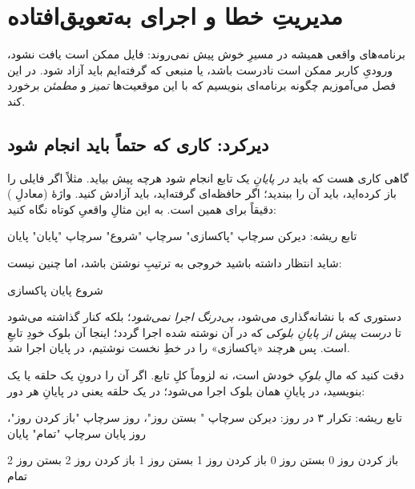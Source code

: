 \chapter{مدیریتِ خطا و اجرای به‌تعویق‌افتاده}%
\label{ch:defer}

برنامه‌های واقعی همیشه در مسیرِ خوش پیش نمی‌روند: فایل ممکن است یافت نشود،
ورودیِ کاربر ممکن است نادرست باشد، یا منبعی که گرفته‌ایم باید آزاد شود. در این
فصل می‌آموزیم چگونه برنامه‌ای بنویسیم که با این موقعیت‌ها \emph{تمیز} و
\emph{مطمئن} برخورد کند.

\section{دیرکرد: کاری که حتماً باید انجام شود}

گاهی کاری هست که باید \emph{در پایانِ} یک تابع انجام شود هرچه پیش بیاید.
مثلاً اگر فایلی را باز کرده‌اید، باید آن را ببندید؛ اگر حافظه‌ای گرفته‌اید، باید
آزادش کنید. واژهٔ  (معادلِ ) دقیقاً برای همین است. به
این مثالِ واقعیِ کوتاه نگاه کنید:

\begin{salamfa}
تابع ریشه:
    دیرکن سرچاپ "پاکسازی"
    سرچاپ "شروع"
    سرچاپ "پایان"
پایان
\end{salamfa}

شاید انتظار داشته باشید خروجی به ترتیبِ نوشتن باشد، اما چنین نیست:

\begin{progoutfa}
شروع
پایان
پاکسازی
\end{progoutfa}

دستوری که با  نشانه‌گذاری می‌شود، \emph{بی‌درنگ اجرا نمی‌شود}؛
بلکه کنار گذاشته می‌شود تا \emph{درست پیش از پایانِ بلوکی} که در آن نوشته شده
اجرا گردد؛ اینجا آن بلوک خودِ تابعِ  است. پس هرچند «پاکسازی» را در
خطِ نخست نوشتیم، در پایان اجرا شد.

دقت کنید که  مالِ \emph{بلوکِ} خودش است، نه لزوماً کلِ تابع. اگر آن را
درونِ یک حلقه یا یک  بنویسید، در پایانِ همان بلوک اجرا می‌شود؛ در یک
حلقه یعنی در پایانِ هر دور:

\begin{salamfa}
تابع ریشه:
    تکرار ۳ در روز:
        دیرکن سرچاپ "  بستن روز"، روز
        سرچاپ "باز کردن روز"، روز
    پایان
    سرچاپ "تمام"
پایان
\end{salamfa}

\begin{progoutfa}
باز کردن روز 0
  بستن روز 0
باز کردن روز 1
  بستن روز 1
باز کردن روز 2
  بستن روز 2
تمام
\end{progoutfa}

